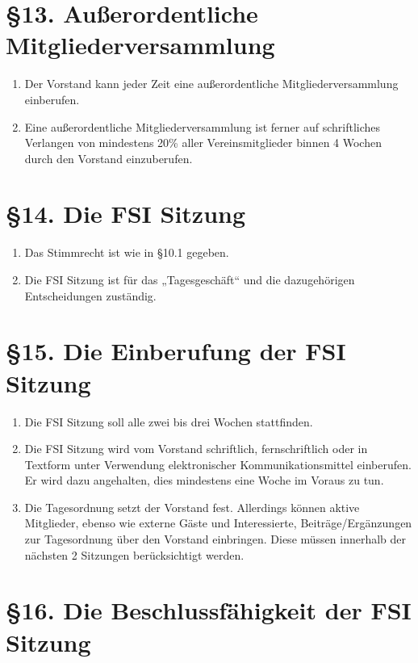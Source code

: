 \documentclass[a4paper,12pt]{article}
\begin{document}
\section*{§13. Außerordentliche Mitgliederversammlung}

\begin{enumerate}
	\item
		Der Vorstand kann jeder Zeit eine außerordentliche
		Mitgliederversammlung einberufen.
    	\item
		Eine außerordentliche Mitgliederversammlung ist ferner auf
		schriftliches Verlangen von mindestens 20\% aller
		Vereinsmitglieder binnen 4 Wochen durch den Vorstand
		einzuberufen.
\end{enumerate}

\section*{§14. Die FSI Sitzung}

\begin{enumerate}
    	\item
		Das Stimmrecht ist wie in §10.1 gegeben.
    	\item
		Die FSI Sitzung ist für das „Tagesgeschäft“ und die
		dazugehörigen Entscheidungen zuständig.
\end{enumerate}

\section*{§15. Die Einberufung der FSI Sitzung}

\begin{enumerate}
    	\item
		Die FSI Sitzung soll alle zwei bis drei Wochen stattfinden.
    	\item
		Die FSI Sitzung wird vom Vorstand schriftlich, fernschriftlich
		oder in Textform unter Verwendung elektronischer
		Kommunikationsmittel einberufen. Er wird dazu angehalten, dies
		mindestens eine Woche im Voraus zu tun.
    	\item
		Die Tagesordnung setzt der Vorstand fest. Allerdings können
		aktive Mitglieder, ebenso wie externe Gäste und Interessierte,
		Beiträge/Ergänzungen zur Tagesordnung über den Vorstand
		einbringen. Diese müssen innerhalb der nächsten 2 Sitzungen
		berücksichtigt werden.
\end{enumerate}

\section*{§16. Die Beschlussfähigkeit der FSI Sitzung}
\end{document}
